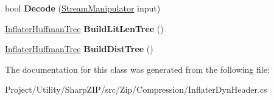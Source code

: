 \begin{DoxyCompactItemize}
bool {\bfseries Decode} (\hyperlink{class_i_c_sharp_code_1_1_sharp_zip_lib_1_1_zip_1_1_compression_1_1_streams_1_1_stream_manipulator}{Stream\+Manipulator} input)
\item 
\mbox{\label{class_i_c_sharp_code_1_1_sharp_zip_lib_1_1_zip_1_1_compression_1_1_inflater_dyn_header_a5ab9038d6db0dbffe4e5fd64815b5965}} 
\hyperlink{class_i_c_sharp_code_1_1_sharp_zip_lib_1_1_zip_1_1_compression_1_1_inflater_huffman_tree}{Inflater\+Huffman\+Tree} {\bfseries Build\+Lit\+Len\+Tree} ()
\item 
\mbox{\label{class_i_c_sharp_code_1_1_sharp_zip_lib_1_1_zip_1_1_compression_1_1_inflater_dyn_header_aa4703f6b1fe270e9368ec2ce43ce8907}} 
\hyperlink{class_i_c_sharp_code_1_1_sharp_zip_lib_1_1_zip_1_1_compression_1_1_inflater_huffman_tree}{Inflater\+Huffman\+Tree} {\bfseries Build\+Dist\+Tree} ()
\end{DoxyCompactItemize}


The documentation for this class was generated from the following file\+:\begin{DoxyCompactItemize}
\item 
Project/\+Utility/\+Sharp\+Z\+I\+P/src/\+Zip/\+Compression/Inflater\+Dyn\+Header.\+cs\end{DoxyCompactItemize}
